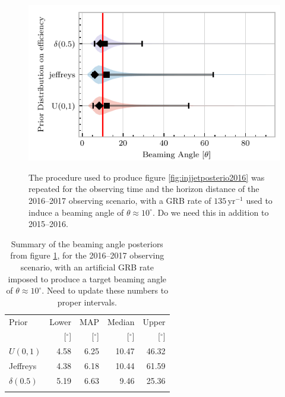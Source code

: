 \documentclass[twocolumn,nofootinbib]{revtex4-1}
\newcommand{\yr}{\mathrm{yr}}
\newcommand{\dwnote}[1]{{\color{dwnote}{[\textbf{DW}: #1]}}}
\renewcommand{\dwnote}{}
\begin{document}
\begin{figure}%
\centering
{\includegraphics[width=\linewidth]{O2_injections_violin.pdf}}
\caption{The procedure used to produce figure \ref{fig:injjetposterio2016} was repeated for the observing time and the horizon distance of the 2016--2017 observing scenario, with a GRB rate of $135 \,\yr^{-1}$ used to induce a beaming angle of $\theta \approx 10^{\circ}$.
  \dwnote{Do we need this in addition to 2015--2016.}
  \label{fig:injjetposterio2022}}
\end{figure}
\begin{table}
  \centering
  \begin{tabular}{lrrrr}
    \toprule
    Prior & Lower & MAP & Median & Upper\\
          & [$^\circ$] & [$^\circ$]& [$^\circ$]& [$^\circ$] \\
    \colrule
    \(U(0,1)\) & 4.58 & 6.25 & 10.47 & 46.32\\
    Jeffreys & 4.38 & 6.18 & 10.44 & 61.59\\
    \(δ(0.5)\) & 5.19 & 6.63 & 9.46 & 25.36\\
    \botrule
\end{tabular}
\caption{Summary of the beaming angle posteriors from figure
  \ref{fig:injjetposterio2022}, for the 2016--2017 observing scenario,
  with an artificial GRB rate imposed to produce a target beaming
  angle of $\theta \approx 10^{\circ}$.   \dwnote{Need to update these numbers to proper intervals.}}
  \label{tab:summaryinj2015}
\end{table}
\end{document}
